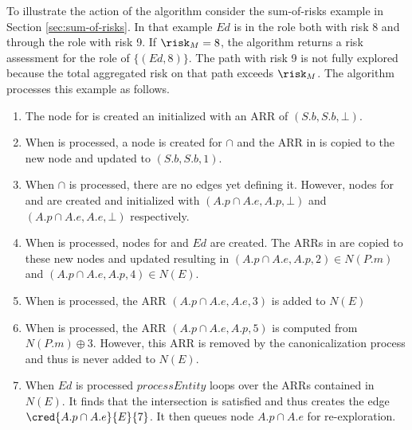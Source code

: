 To illustrate the action of the algorithm consider the sum-of-risks
example in Section \ref{sec:sum-of-risks}. In that example $\mathit{Ed}$
is in the  role both with risk 8 and through the
 role with risk 9. If $\risk_M = 8$, the
algorithm returns a risk assessment for the  role of
$\{(\mathit{Ed}, 8)\}$. The path with risk 9 is not fully explored
because the total aggregated risk on that path exceeds $\risk_M$. The
algorithm processes this example as follows.
\begin{enumerate}

\item The node for  is created an initialized with an
  ARR of $(S.b, S.b, \bot)$.

\item When  is processed, a node is created for
   $\cap$  and the ARR in
   is copied to the new node and updated to $(S.b,
  S.b, 1)$.

\item When  $\cap$  is
  processed, there are no edges yet defining it. However, nodes for
   and  are created and
  initialized with $(A.p \cap A.e, A.p, \bot)$ and $(A.p \cap A.e, A.e,
  \bot)$ respectively.

\item When  is processed, nodes for
   and $\mathit{Ed}$ are created. The ARRs in
   are copied to these new nodes and updated
  resulting in $(A.p \cap A.e, A.p, 2) \in N(P.m)$ and $(A.p \cap A.e,
  A.p, 4) \in N(E)$.

\item When  is processed, the ARR $(A.p \cap A.e,
  A.e, 3)$ is added to $N(E)$

\item When  is processed, the ARR $(A.p \cap
  A.e, A.p, 5)$ is computed from $N(P.m) \oplus 3$. However, this ARR is
  removed by the canonicalization process and thus is never added to
  $N(E)$.

\item When $\mathit{Ed}$ is processed $\mathit{processEntity}$ loops
  over the ARRs contained in $N(E)$. It finds that the intersection is
  satisfied and thus creates the edge $\cred{A.p \cap A.e}{E}{7}$. It
  then queues node $A.p \cap A.e$ for re-exploration.


\end{enumerate}

